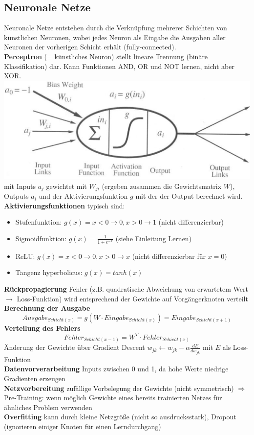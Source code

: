 \documentclass[12pt]{article}
\begin{document}
	\subsection{Neuronale Netze}
	Neuronale Netze entstehen durch die Verknüpfung mehrerer Schichten von künstlichen Neuronen, wobei jedes Neuron als Eingabe die Ausgaben aller Neuronen der vorherigen Schicht erhält (fully-connected).\\
	\textbf{Perceptron} (= künstliches Neuron) stellt lineare Trennung (binäre Klassifikation) dar. Kann Funktionen AND, OR und NOT lernen, nicht aber XOR.\\
	\includegraphics[width=\linewidth]{figures/perceptron.png}\\
	mit Inputs $a_j$ gewichtet mit $W_{ji}$ (ergeben zusammen die Gewichtsmatrix $W$), Outputs $a_i$ und der Aktivierungsfunktion $g$ mit der der Output berechnet wird.\\
	\textbf{Aktivierungsfunktionen} typisch sind:
	\begin{itemize}
		\item Stufenfunktion: $g(x) = x < 0 \rightarrow 0, x > 0 \rightarrow 1$ (nicht differenzierbar)
		\item Sigmoidfunktion: $g(x) = \frac{1}{1 + e^{-x}}$ (siehe Einleitung Lernen)
		\item ReLU: $g(x) = x < 0 \rightarrow 0, x > 0 \rightarrow x$ (nicht differenzierbar für $x=0$)
		\item Tangenz hyperbolicus: $g(x) = tanh(x)$
	\end{itemize}
	\textbf{Rückpropagierung} Fehler (z.B. quadratische Abweichung von erwartetem Wert $\rightarrow$ Loss-Funktion) wird entsprechend der Gewichte auf Vorgängerknoten verteilt\\
	\textbf{Berechnung der Ausgabe}
	$$Ausgabe_{Schicht(x)} = g(W \cdot Eingabe_{Schicht(x)}) = Eingabe_{Schicht(x+1)}$$
	\textbf{Verteilung des Fehlers}
	$$Fehler_{Schicht(x-1)} = W^T \cdot Fehler_{Schicht(x)}$$
	Änderung der Gewichte über Gradient Descent $w_{jk} \leftarrow w_{jk} - \alpha \frac{dE}{dw_{jk}}$ mit $E$ als Loss-Funktion\\
	\textbf{Datenvorverarbeitung} Inputs zwischen 0 und 1, da hohe Werte niedrige Gradienten erzeugen\\
	\textbf{Netzvorbereitung} zufällige Vorbelegung der Gewichte (nicht symmetrisch) $\Rightarrow$ Pre-Training: wenn möglich Gewichte eines bereits trainierten Netzes für ähnliches Problem verwenden\\
	\textbf{Overfitting} kann durch kleine Netzgröße (nicht so ausdrucksstark), Dropout (ignorieren einiger Knoten für einen Lerndurchgang)\\
	
	
\end{document}
